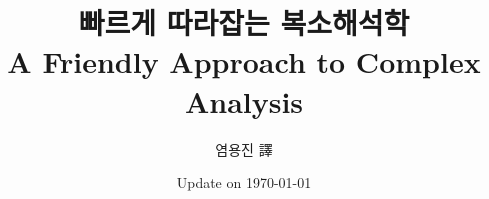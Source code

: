 \documentclass[12pt,twoside]{book}
\numberwithin{equation}{chapter}
\numberwithin{figure}{chapter}
\begin{document}
\title{\bf {\huge 빠르게 따라잡는 복소해석학}\\ A Friendly Approach to Complex Analysis}
\author{염용진 譯}
\date{Update on \today}
\maketitle

\setcounter{tocdepth}{2}
\setcounter{minitocdepth}{1} 

\renewcommand{\contentsname}{목 차}
\tableofcontents
    
    
%
%







\end{document}
